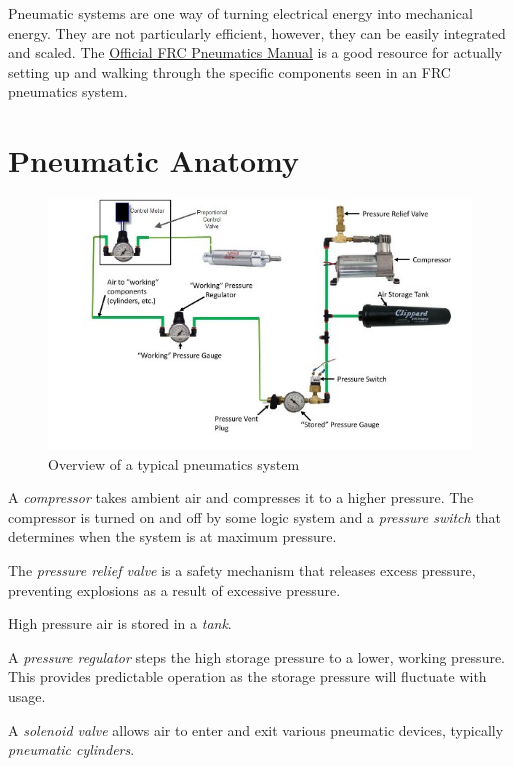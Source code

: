 \documentclass[10pt,letterpaper]{book}
\begin{document}
Pneumatic systems are one way of turning electrical energy into mechanical energy. They are not particularly efficient, however, they can be easily integrated and scaled. The \href{http://www.team358.org/files/pneumatic/2017pneumatics-manual.pdf}{\color{red}\underline{Official FRC Pneumatics Manual}} is a good resource for actually setting up and walking through the specific components seen in an FRC pneumatics system.

\section{Pneumatic Anatomy}

\begin{figure}[H]
	\includegraphics[width=\textwidth]{imgs/pneumatics_overview.jpeg}
	\caption{Overview of a typical pneumatics system}
\end{figure}

\begin{asparaenum}[a)]
	\item A \textit{compressor} takes ambient air and compresses it to a higher pressure. The compressor is turned on and off by some logic system and a \textit{pressure switch} that determines when the system is at maximum pressure.
	\item The \textit{pressure relief valve} is a safety mechanism that releases excess pressure, preventing explosions as a result of excessive pressure.
	\item High pressure air is stored in a \textit{tank}.
	\item A \textit{pressure regulator} steps the high storage pressure to a lower, working pressure. This provides predictable operation as the storage pressure will fluctuate with usage.
	\item A \textit{solenoid valve} allows air to enter and exit various pneumatic devices, typically \textit{pneumatic cylinders}.
\end{asparaenum}
\end{document}
